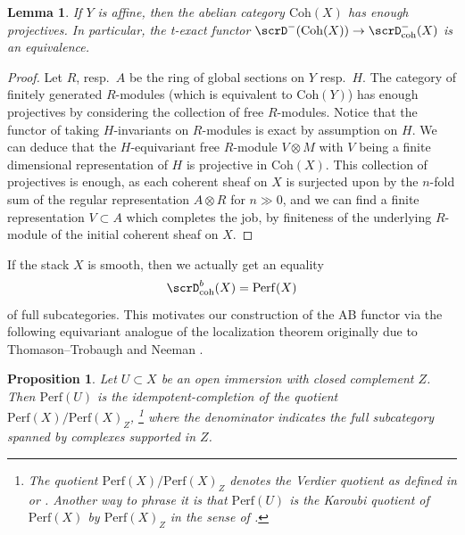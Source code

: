\documentclass[10pt, reqno]{amsart}
\theoremstyle{plain}
\newtheorem{proposition}[theorem]{Proposition}
\newtheorem{lemma}[theorem]{Lemma}
\theoremstyle{definition}
\numberwithin{equation}{section}
\begin{document}
\begin{lemma}\label{lem_enough_proj}
	If $Y$ is affine, then the abelian category $\mathrm{Coh}(X)$ has enough projectives. In particular, the t-exact functor $\scrD^-(\mathrm{Coh}(X))\to \scrD^-_{\mathrm{coh}}(X)$ is an equivalence.
\end{lemma}

\begin{proof}
	Let $R$, resp.~$A$ be the ring of global sections on $Y$ resp.~$H$. The category of finitely generated $R$-modules (which is equivalent to $\mathrm{Coh}(Y)$) has enough projectives by considering the collection of free $R$-modules. Notice that the functor of taking $H$-invariants on $R$-modules is exact by assumption on $H$. We can deduce that the $H$-equivariant free $R$-module $V\otimes M$ with $V$ being a finite dimensional representation of $H$ is projective in $\mathrm{Coh}(X)$. This collection of projectives is enough, as each coherent sheaf on $X$ is surjected upon by the $n$-fold sum of the regular representation $A\otimes R$ for $n\gg 0$, and we can find a finite representation $V \subset A$ which completes the job, by finiteness of the underlying $R$-module of the initial coherent sheaf on $X$.
\end{proof}


If the stack $X$ is smooth, then we actually get an equality 
\begin{equation}\label{equation_coh_VS_perf}
	\scrD^b_{\mathrm{coh}}(X)=\mathrm{Perf}(X)    
\end{equation}
of full subcategories. This motivates our construction of the AB functor via the following equivariant analogue of the localization theorem originally due to Thomason--Trobaugh \cite{TT90} and Neeman \cite{Nee92}.

\begin{proposition}\label{prop_thomason_quotient}
	Let $U \subset X$ be an open immersion with closed complement $Z$. Then $\mathrm{Perf}(U)$ is the idempotent-completion of the quotient $\mathrm{Perf}(X)/\mathrm{Perf}(X)_Z$,
	\footnote{The quotient $\mathrm{Perf}(X)/\mathrm{Perf}(X)_Z$ 
		denotes the Verdier quotient as defined in \cite[Definition A.1.4]{CDH+20} or \cite[Theorem I.3.3]{NS18}. Another way to phrase it is that $\mathrm{Perf}(U)$ is the Karoubi quotient of $\mathrm{Perf}(X)$ 
		by $\mathrm{Perf}(X)_Z$ in the sense of \cite[Definition A.3.6]{CDH+20}.}
	where the denominator indicates the full subcategory spanned by complexes supported in $Z$.
\end{proposition}
\end{document}
